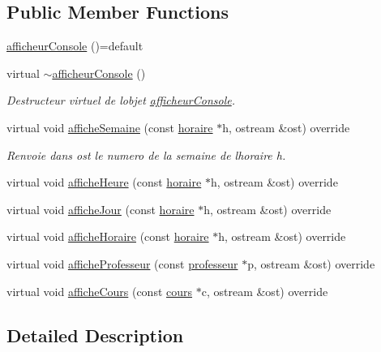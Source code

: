 \subsection*{Public Member Functions}
\begin{DoxyCompactItemize}
\item 
\hyperlink{classafficheur_console_a5d5b09077e150ddb11f0dc5b9cf89f6f}{afficheur\+Console} ()=default
\item 
virtual \hyperlink{classafficheur_console_a0f902699d385726ea9d9889d37e57558}{$\sim$afficheur\+Console} ()
\begin{DoxyCompactList}\small\item\em Destructeur virtuel de l\textquotesingle{}objet \hyperlink{classafficheur_console}{afficheur\+Console}. \end{DoxyCompactList}\item 
virtual void \hyperlink{classafficheur_console_a0930128cabb9b2585db0140f7614a3df}{affiche\+Semaine} (const \hyperlink{classhoraire}{horaire} $\ast$h, ostream \&ost) override
\begin{DoxyCompactList}\small\item\em Renvoie dans ost le numero de la semaine de l\textquotesingle{}horaire h. \end{DoxyCompactList}\item 
virtual void \hyperlink{classafficheur_console_a842884a9553df737f781d2f8f040d30e}{affiche\+Heure} (const \hyperlink{classhoraire}{horaire} $\ast$h, ostream \&ost) override
\item 
virtual void \hyperlink{classafficheur_console_a9d69206c3cd6409d1437ee546e71cf25}{affiche\+Jour} (const \hyperlink{classhoraire}{horaire} $\ast$h, ostream \&ost) override
\item 
virtual void \hyperlink{classafficheur_console_a44e40b275c8b0b1a33cdc5bd46a31cf3}{affiche\+Horaire} (const \hyperlink{classhoraire}{horaire} $\ast$h, ostream \&ost) override
\item 
virtual void \hyperlink{classafficheur_console_aa178d74ab314df687800c612a3615ed6}{affiche\+Professeur} (const \hyperlink{classprofesseur}{professeur} $\ast$p, ostream \&ost) override
\item 
virtual void \hyperlink{classafficheur_console_aa77bdd8065edd5269f83679490e78dee}{affiche\+Cours} (const \hyperlink{classcours}{cours} $\ast$c, ostream \&ost) override
\end{DoxyCompactItemize}


\subsection{Detailed Description}


